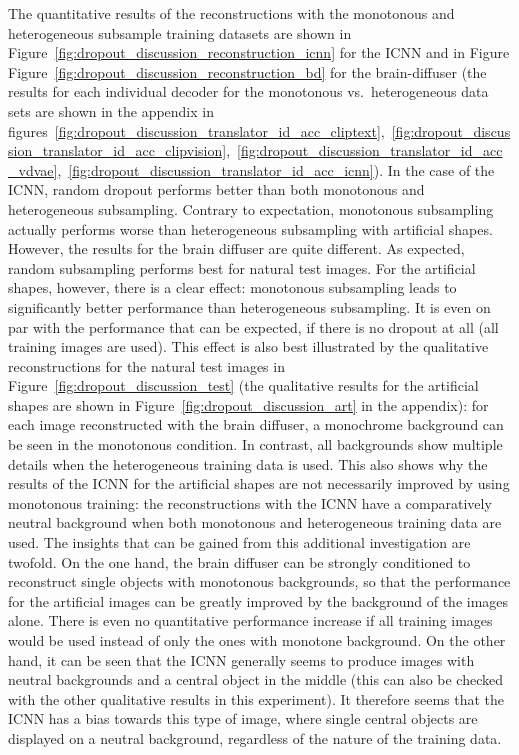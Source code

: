 The quantitative results of the reconstructions with the monotonous and heterogeneous subsample training datasets are shown in Figure~\ref{fig:dropout_discussion_reconstruction_icnn} for the ICNN and in Figure Figure~\ref{fig:dropout_discussion_reconstruction_bd} for the brain-diffuser (the results for each individual decoder for the monotonous vs.\ heterogeneous data sets are shown in the appendix in figures~\ref{fig:dropout_discussion_translator_id_acc_cliptext},~\ref{fig:dropout_discussion_translator_id_acc_clipvision},~\ref{fig:dropout_discussion_translator_id_acc_vdvae},~\ref{fig:dropout_discussion_translator_id_acc_icnn}). In the case of the ICNN, random dropout performs better than both monotonous and heterogeneous subsampling. Contrary to expectation, monotonous subsampling actually performs worse than heterogeneous subsampling with artificial shapes. However, the results for the brain diffuser are quite different. As expected, random subsampling performs best for natural test images. For the artificial shapes, however, there is a clear effect: monotonous subsampling leads to significantly better performance than heterogeneous subsampling. It is even on par with the performance that can be expected, if there is no dropout at all (all training images are used). This effect is also best illustrated by the qualitative reconstructions for the natural test images in Figure~\ref{fig:dropout_discussion_test} (the qualitative results for the artificial shapes are shown in Figure~\ref{fig:dropout_discussion_art} in the appendix): for each image reconstructed with the brain diffuser, a monochrome background can be seen in the monotonous condition. In contrast, all backgrounds show multiple details when the heterogeneous training data is used. This also shows why the results of the ICNN for the artificial shapes are not necessarily improved by using monotonous training: the reconstructions with the ICNN have a comparatively neutral background when both monotonous and heterogeneous training data are used. The insights that can be gained from this additional investigation are twofold. On the one hand, the brain diffuser can be strongly conditioned to reconstruct single objects with monotonous backgrounds, so that the performance for the artificial images can be greatly improved by the background of the images alone. There is even no quantitative performance increase if all training images would be used instead of only the ones with monotone background. On the other hand, it can be seen that the ICNN generally seems to produce images with neutral backgrounds and a central object in the middle (this can also be checked with the other qualitative results in this experiment). It therefore seems that the ICNN has a bias towards this type of image, where single central objects are displayed on a neutral background, regardless of the nature of the training data. 

